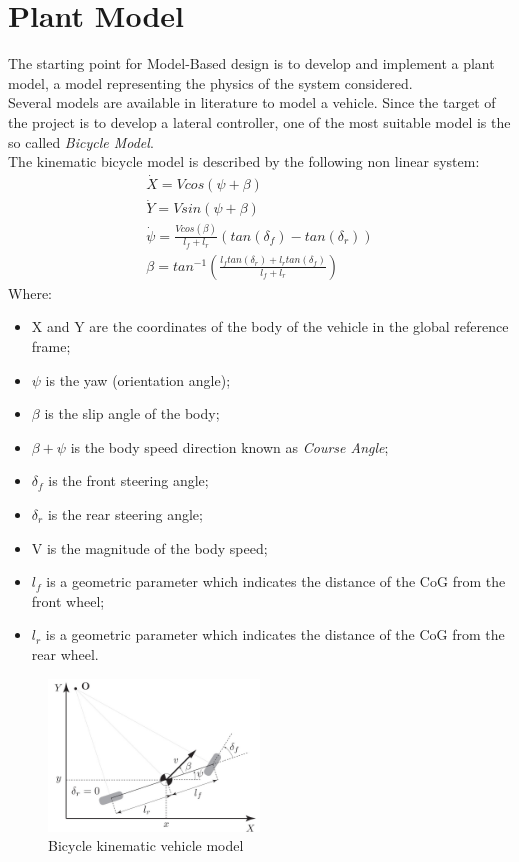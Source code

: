 \section{Plant Model}
\label{chap:Vehicle_model}
The starting point for Model-Based design is to develop and implement a plant model, a model representing the physics of the system considered.\\
Several models are available in literature to model a vehicle. Since the target of the project is to develop a lateral controller, one of the most suitable model is the so called \textit{Bicycle Model}.\\
The kinematic bicycle model is described by the following non linear system:
\begin{align}
    \dot{X} = Vcos(\psi + \beta)\\
    \dot{Y} = Vsin(\psi + \beta)\\
    \dot{\psi} = \frac{Vcos(\beta)}{l_f + l_r}\left(tan(\delta_f) - tan(\delta_r)\right)\\
    \beta = tan^{-1}\left(\frac{l_ftan(\delta_r) + l_rtan(\delta_f)}{l_f + l_r}\right)
\end{align}
Where:
\begin{itemize}
    \item X and Y are the coordinates of the body of the vehicle in the global reference frame;
    \item $\psi$ is the yaw (orientation angle);
    \item $\beta$ is the slip angle of the body;
    \item $\beta + \psi$ is the body speed direction known as \textit{Course Angle};
    \item $\delta_f$ is the front steering angle;
    \item $\delta_r$ is the rear steering angle;
    \item V is the magnitude of the body speed;
    \item $l_f$ is a geometric parameter which indicates the distance of the CoG from the front wheel;
    \item $l_r$ is a geometric parameter which indicates the distance of the CoG from the rear wheel.
\end{itemize}
\begin{figure}[H]
    \centering
    \includegraphics[width=0.5\textwidth]{Figures/Bicycle_model.jpg}
    \caption{Bicycle kinematic vehicle model}
    \label{fig:Bicycle_kin}
\end{figure}
